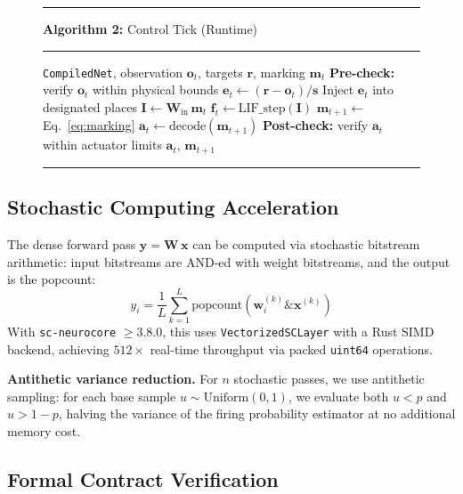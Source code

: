 \documentclass[twocolumn,preprintnumbers,amsmath,amssymb,prl,floatfix]{revtex4-2}
\begin{document}
\begin{figure}[t]
\hrule\smallskip
\textbf{Algorithm 2:} Control Tick (Runtime)
\label{alg:tick}
\smallskip\hrule\smallskip
\begin{algorithmic}[1]
\Require \texttt{CompiledNet}, observation $\mathbf{o}_t$,
         targets $\mathbf{r}$, marking $\mathbf{m}_t$
\State \textbf{Pre-check:} verify $\mathbf{o}_t$ within
       physical bounds
\State $\mathbf{e}_t \gets (\mathbf{r} - \mathbf{o}_t) /
       \mathbf{s}$ 
\State Inject $\mathbf{e}_t$ into designated places
\State $\mathbf{I} \gets \mathbf{W}_\mathrm{in}\,\mathbf{m}_t$
\State $\mathbf{f}_t \gets \mathrm{LIF\_step}(\mathbf{I})$
\State $\mathbf{m}_{t+1} \gets$ Eq.~\ref{eq:marking}
\State $\mathbf{a}_t \gets \mathrm{decode}(\mathbf{m}_{t+1})$
\State \textbf{Post-check:} verify $\mathbf{a}_t$ within
       actuator limits
\State \Return $\mathbf{a}_t$, $\mathbf{m}_{t+1}$
\end{algorithmic}
\smallskip\hrule
\end{figure}

\subsection{Stochastic Computing Acceleration}

The dense forward pass $\mathbf{y} = \mathbf{W}\,\mathbf{x}$
can be computed via stochastic bitstream arithmetic: input
bitstreams are AND-ed with weight bitstreams, and the output is
the popcount:
%
\begin{equation}
  y_i = \frac{1}{L} \sum_{k=1}^{L}
  \mathrm{popcount}\!\left(
    \mathbf{w}_i^{(k)} \mathbin{\&} \mathbf{x}^{(k)}
  \right)
\end{equation}
%
With \texttt{sc-neurocore} $\geq 3.8.0$, this uses
\texttt{VectorizedSCLayer} with a Rust SIMD backend,
achieving $512\times$ real-time throughput via packed
\texttt{uint64} operations.

\textbf{Antithetic variance reduction.}\quad
For $n$ stochastic passes, we use antithetic sampling:
for each base sample $u \sim \mathrm{Uniform}(0,1)$,
we evaluate both $u < p$ and $u > 1-p$, halving the
variance of the firing probability estimator at no
additional memory cost.

\subsection{Formal Contract Verification}
\label{sec:contracts}
\end{document}
